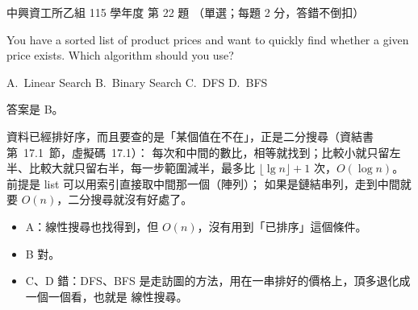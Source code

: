 \begin{pastexam}[label={px:nchu-115-is-22}]{中興資工所乙組 115 學年度 第 22 題}
（單選；每題 2 分，答錯不倒扣）

You have a sorted list of product prices and want to quickly find whether a given price exists.
Which algorithm should you use?

A.~Linear Search \qquad B.~Binary Search \qquad C.~DFS \qquad D.~BFS
\end{pastexam}

\begin{pastsoln}
答案是 B。

資料已經排好序，而且要查的是「某個值在不在」，正是二分搜尋（資結書第~17.1~節，虛擬碼~17.1）：
每次和中間的數比，相等就找到；比較小就只留左半、比較大就只留右半，每一步範圍減半，最多比
$\lfloor \lg n \rfloor + 1$ 次，$O(\log n)$。 前提是 list 可以用索引直接取中間那一個（陣列）；
如果是鏈結串列，走到中間就要 $O(n)$，二分搜尋就沒有好處了。
\begin{itemize}
\item A：線性搜尋也找得到，但 $O(n)$，沒有用到「已排序」這個條件。
\item B 對。
\item C、D 錯：DFS、BFS 是走訪圖的方法，用在一串排好的價格上，頂多退化成一個一個看，也就是
線性搜尋。
\end{itemize}
\end{pastsoln}
